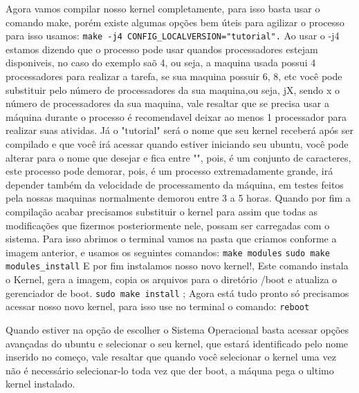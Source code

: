 \documentclass[12pt]{article}
\begin{document}
	Agora vamos compilar nosso kernel completamente, para isso basta usar o comando make, porém existe algumas opções bem úteis para agilizar o processo para isso usamos: \newline
	\verb!make -­j4 CONFIG_LOCALVERSION="tutorial".! \newline
	Ao usar o -j4 estamos dizendo que o processo pode usar quandos processadores estejam disponiveis, no caso do exemplo saõ 4, ou seja, a maquina usada possui 4 processadores para realizar a tarefa, se sua maquina possuir 6, 8, etc você pode substituir pelo número de processadores da sua maquina,ou seja, jX, sendo x o número de processadores da sua maquina, vale resaltar que se precisa usar a máquina durante o processo é recomendavel deixar ao menos 1 processador para realizar suas atividas. Já o "tutorial" será o nome que seu kernel receberá após ser compilado e que você irá acessar quando estiver iniciando seu ubuntu, você pode alterar para o nome que desejar e fica entre "", pois, é um conjunto de caracteres, este processo pode demorar, pois, é um processo extremadamente grande, irá depender também da velocidade de processamento da máquina, em testes feitos pela nossas maquinas normalmente demorou entre 3 a 5 horas.
	\newline
	Quando por fim a compilação acabar precisamos substituir o kernel para assim que todas as modificações que fizermos posteriormente nele, possam ser carregadas com o sistema. Para isso abrimos o terminal vamos na pasta que criamos conforme a imagem anterior, e usamos os seguintes comandos: \newline
	\verb"make modules" \newline
	\verb"sudo make modules_install"\newline
	E por fim instalamos nosso novo kernel!, Este comando instala o Kernel, gera a imagem, copia os arquivos para o diretório /boot e atualiza o gerenciador de boot.\newline
	\verb"sudo make install" \newline;
	Agora está tudo pronto só precisamos acessar nosso novo kernel, para isso use no terminal o comando:\newline
	\verb"reboot" \newline
	
	Quando estiver na opção de escolher o Sistema Operacional basta acessar opções avançadas do ubuntu e selecionar o seu kernel, que estará identificado pelo nome inserido no começo, vale resaltar que quando você selecionar o kernel uma vez não é necessário selecionar-lo toda vez que der boot, a máquna pega o ultimo kernel instalado.
	
\end{document}
